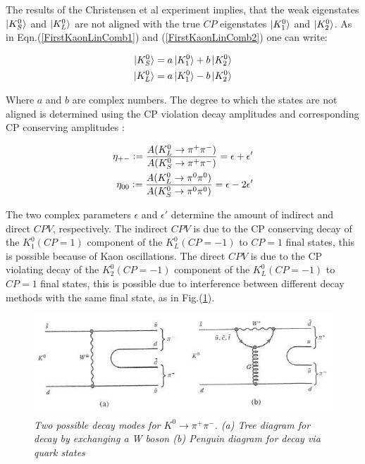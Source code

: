 The results of the Christensen et al experiment implies, that the weak eigenstates $\ket{K^{0}_{S}}$ and $\ket{K^{0}_{L}}$ are not aligned with the true $CP$ eigenstates $\ket{K^{0}_{1}}$ and $\ket{K^{0}_{2}}$. As in Eqn.(\ref{FirstKaonLinComb1}) and (\ref{FirstKaonLinComb2}) one can write:

\begin{align}
\label{KaonLincomb11}
\ket{K^{0}_{S}} = a \ket{K^{0}_{1}} + b \ket{K^{0}_{2}} \\
\label{KaonLincomb12}
\ket{K^{0}_{L}} = a \ket{K^{0}_{1}} - b \ket{K^{0}_{2}}
\end{align}

\noindent Where $a$ and $b$ are complex numbers. The degree to which the states are not aligned is determined using the CP violation decay amplitudes and corresponding CP conserving amplitudes \cite{Measurements_Direct_CPV_Kaons_KTev}: 

\begin{align*}
\eta_{+-} \vcentcolon= \frac{A(K^{0}_L \rightarrow \pi^+ \pi^-)}{A(K^{0}_S \rightarrow \pi^+ \pi^-)} = \epsilon + \epsilon' \\ 
\eta_{00} \vcentcolon= \frac{A(K^{0}_L \rightarrow \pi^0 \pi^0)}{A(K^{0}_S \rightarrow \pi^0 \pi^0)} = \epsilon - 2\epsilon' 
\end{align*}

\noindent The two complex parameters $\epsilon$ and $\epsilon'$ determine the amount of indirect and direct $CPV$, respectively. The indirect $CPV$ is due to the CP conserving decay of the $K^{0}_{1}(CP =1)$ component of the $K^{0}_{L}(CP=-1)$ to $CP=1$ final states, this is possible because of Kaon oscillations. The direct $CPV$ is due to the CP violating decay of the $K^{0}_{2}(CP =-1)$ component of the $K^{0}_{L}(CP=-1)$ to $CP=1$ final states, this is possible due to interference between different decay methods with the same final state, as in Fig.(\ref{HEPP_intro_Perkins}).  

\begin{figure}[h!]
\begin{center}
\includegraphics[scale=0.3]{figs/Perkins_Interference_Kaons.png}
\end{center}
\caption{\textit{Two possible decay modes for $K^{0} \rightarrow \pi^+ \pi^-$. (a) Tree diagram for decay by exchanging a W boson (b) Penguin diagram for decay via quark states \cite{HEPP_intro_Perkins}}}
\label{HEPP_intro_Perkins}
\end{figure}

